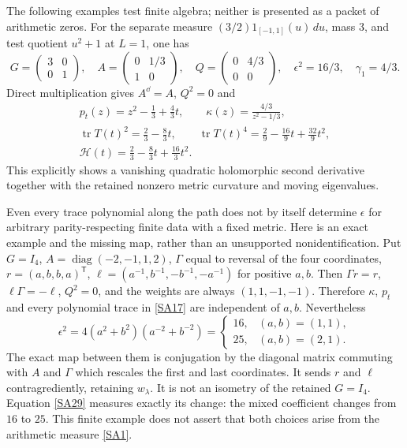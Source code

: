 \documentclass[11pt]{article}
\newcommand{\tr}{\operatorname{tr}}\newcommand{\Res}{\operatorname{Res}}
\begin{document}
The following examples test finite algebra; neither
is presented as a packet of arithmetic zeros.
For the separate measure $(3/2)1_{[-1,1]}(u)\,du$,
mass $3$, and test quotient $u^2+1$ at $L=1$, one has
\begin{equation}\tag{SA38}\label{SA38}
G=\begin{pmatrix}3&0\\0&1\end{pmatrix},\quad
A=\begin{pmatrix}0&1/3\\1&0\end{pmatrix},\quad
Q=\begin{pmatrix}0&4/3\\0&0\end{pmatrix},\quad
\epsilon^2=16/3,\quad\gamma_1=4/3 .
\end{equation}
Direct multiplication gives $A^{\dd}=A$, $Q^2=0$ and
\begin{equation}\tag{SA39}\label{SA39}
\begin{gathered}
p_t(z)=z^2-\frac13+\frac43t,\qquad
\kappa(z)=\frac{4/3}{z^2-1/3},\\
\tr T(t)^2=\frac23-\frac83t,\qquad
\tr T(t)^4=\frac29-\frac{16}{9}t+\frac{32}{9}t^2,\\
\mathcal H(t)=\frac23-\frac83t+\frac{16}{3}t^2.
\end{gathered}
\end{equation}
This explicitly shows a vanishing quadratic holomorphic
second derivative together with the retained nonzero
metric curvature and moving eigenvalues.

Even every trace polynomial along the path does not by
itself determine $\epsilon$ for arbitrary parity-respecting
finite data with a fixed metric. Here is an exact example
and the missing map, rather than an unsupported
nonidentification. Put $G=I_4$,
$A=\operatorname{diag}(-2,-1,1,2)$,
$\Gamma$ equal to reversal of the four coordinates,
$r=(a,b,b,a)^{\mathsf T}$,
$\ell=(a^{-1},b^{-1},-b^{-1},-a^{-1})$ for positive
$a,b$. Then $\Gamma r=r$, $\ell\Gamma=-\ell$,
$Q^2=0$, and the weights are always $(1,1,-1,-1)$.
Therefore $\kappa$, $p_t$ and every polynomial trace
in \eqref{SA17} are independent of $a,b$. Nevertheless
\begin{equation}\tag{SA40}\label{SA40}
\epsilon^2
=4(a^2+b^2)(a^{-2}+b^{-2})
=\begin{cases}16,&(a,b)=(1,1),\\25,&(a,b)=(2,1).\end{cases}
\end{equation}
The exact map between them is conjugation by the
diagonal matrix commuting with $A$ and $\Gamma$ which
rescales the first and last coordinates. It sends $r$
and $\ell$ contragrediently, retaining $w_\lambda$.
It is not an isometry of the retained $G=I_4$.
Equation \eqref{SA29} measures exactly its change:
the mixed coefficient changes from $16$ to $25$.
This finite example does not assert that both choices
arise from the arithmetic measure \eqref{SA1}.
\end{document}
